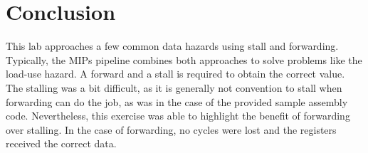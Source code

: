\documentclass[twocolumn]{article}
\begin{document}
\section{Conclusion}

This lab approaches a few common data hazards using stall and forwarding. Typically, the MIPs pipeline combines both approaches to solve problems like the load-use hazard. A forward and a stall is required to obtain the correct value. The stalling was a bit difficult, as it is generally not convention to stall when forwarding can do the job, as was in the case of the provided sample assembly code. Nevertheless, this exercise was able to highlight the benefit of forwarding over stalling. In the case of forwarding, no cycles were lost and the registers received the correct data. 



\printbibliography
\end{document}
